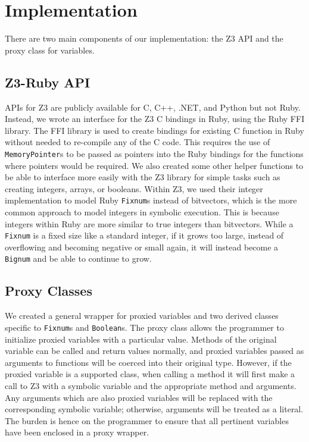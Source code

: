 \documentclass[10pt]{article}
\begin{document}
\section{Implementation}
There are two main components of our implementation: the Z3 API and the proxy class for variables.\\

\subsection{Z3-Ruby API}
APIs for Z3 are publicly available for C, C++, .NET, and Python \textemdash but not Ruby.  Instead, we wrote an interface for the Z3 C bindings in Ruby, using the Ruby FFI library.  The FFI library is used to create bindings for existing C function in Ruby without needed to re-compile any of the C code.  This requires the use of \texttt{MemoryPointer}s to be passed as pointers into the Ruby bindings for the functions where pointers would be required.  We also created some other helper functions to be able to interface more easily with the Z3 library for simple tasks such as creating integers, arrays, or booleans.  Within Z3, we used their integer implementation to model Ruby \texttt{Fixnum}s instead of bitvectors, which is the more common approach to model integers in symbolic execution.  This is because integers within Ruby are more similar to true integers than bitvectors.  While a \texttt{Fixnum} is a fixed size like a standard integer, if it grows too large, instead of overflowing and becoming negative or small again, it will instead become a \texttt{Bignum} and be able to continue to grow.\\

\subsection{Proxy Classes}
We created a general wrapper for proxied variables and two derived classes specific to \texttt{Fixnum}s and \texttt{Boolean}s.  The proxy class allows the programmer to initialize proxied variables with a particular value.  Methods of the original variable can be called and return values normally, and proxied variables passed as arguments to functions will be coerced into their original type.  However, if the proxied variable is a supported class, when calling a method it will first make a call to Z3 with a symbolic variable and the appropriate method and arguments.  Any arguments which are also proxied variables will be replaced with the corresponding symbolic variable; otherwise, arguments will be treated as a literal.  The burden is hence on the programmer to ensure that all pertinent variables have been enclosed in a proxy wrapper.\\
\end{document}
